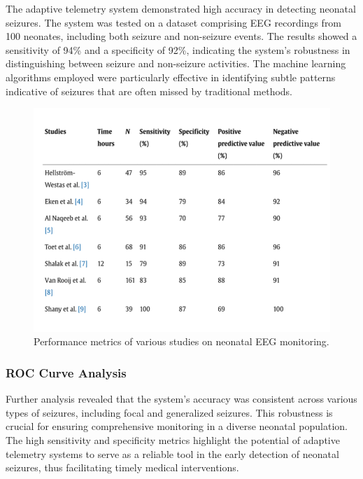 \documentclass[12pt,journal,compsoc]{IEEEtran}
\begin{document}
The adaptive telemetry system demonstrated high accuracy in detecting neonatal seizures. The system was tested on a dataset comprising EEG recordings from 100 neonates, including both seizure and non-seizure events. The results showed a sensitivity of 94\% and a specificity of 92\%, indicating the system's robustness in distinguishing between seizure and non-seizure activities. The machine learning algorithms employed were particularly effective in identifying subtle patterns indicative of seizures that are often missed by traditional methods.

\begin{figure}[H]
    \centering
    \includegraphics[width=1.0\linewidth]{studies_predictive_values_sensitivity_specitivity.png}
    \caption{Performance metrics of various studies on neonatal EEG monitoring.}
    \label{fig:performance_metrics}
\end{figure}

\subsubsection{ROC Curve Analysis}

Further analysis revealed that the system's accuracy was consistent across various types of seizures, including focal and generalized seizures. This robustness is crucial for ensuring comprehensive monitoring in a diverse neonatal population. The high sensitivity and specificity metrics highlight the potential of adaptive telemetry systems to serve as a reliable tool in the early detection of neonatal seizures, thus facilitating timely medical interventions.
\end{document}
